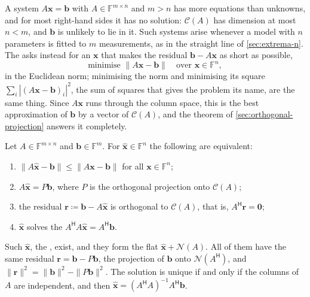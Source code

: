 A system $A\mathbf x=\mathbf b$ with $A\in\mathbb F^{m\times n}$ and $m>n$ has more equations than unknowns, and for most right-hand sides it has no solution: $\mathcal C(A)$ has dimension at most $n<m$, and $\mathbf b$ is unlikely to lie in it. Such systems arise whenever a model with $n$ parameters is fitted to $m$ measurements, as in the straight line of \cref{sec:extrema-n}. The  asks instead for an $\mathbf x$ that makes the residual $\mathbf b-A\mathbf x$ as short as possible,
\[
\text{minimise }\|A\mathbf x-\mathbf b\|\quad\text{over }\mathbf x\in\mathbb F^n ,
\]
in the Euclidean norm; minimising the norm and minimising its square $\sum_i|(A\mathbf x-\mathbf b)_i|^2$, the sum of squares that gives the problem its name, are the same thing. Since $A\mathbf x$ runs through the column space, this is the best approximation of $\mathbf b$ by a vector of $\mathcal C(A)$, and the theorem of \cref{sec:orthogonal-projection} answers it completely.

\begin{theorem}
\label{thm:least-squares}
Let $A\in\mathbb F^{m\times n}$ and $\mathbf b\in\mathbb F^m$. For $\hat{\mathbf x}\in\mathbb F^n$ the following are equivalent:
\begin{enumerate}
\item $\|A\hat{\mathbf x}-\mathbf b\|\le\|A\mathbf x-\mathbf b\|$ for all $\mathbf x\in\mathbb F^n$;
\item $A\hat{\mathbf x}=P\mathbf b$, where $P$ is the orthogonal projection onto $\mathcal C(A)$;
\item the residual $\mathbf r\coloneqq\mathbf b-A\hat{\mathbf x}$ is orthogonal to $\mathcal C(A)$, that is, $A^{\mathsf H}\mathbf r=\mathbf 0$;
\item $\hat{\mathbf x}$ solves the  $A^{\mathsf H}A\hat{\mathbf x}=A^{\mathsf H}\mathbf b$.
\end{enumerate}
Such $\hat{\mathbf x}$, the , exist, and they form the flat $\hat{\mathbf x}+\mathcal N(A)$. All of them have the same residual $\mathbf r=\mathbf b-P\mathbf b$, the projection of $\mathbf b$ onto $\mathcal N(A^{\mathsf H})$, and $\|\mathbf r\|^2=\|\mathbf b\|^2-\|P\mathbf b\|^2$. The solution is unique if and only if the columns of $A$ are independent, and then $\hat{\mathbf x}=(A^{\mathsf H}A)^{-1}A^{\mathsf H}\mathbf b$.
\end{theorem}


